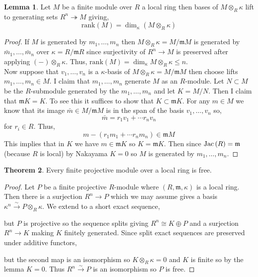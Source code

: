 \documentclass[12pt]{extarticle}
\theoremstyle{definition}
\newtheorem{theorem}{Theorem}[section]
\newtheorem{lemma}[theorem]{Lemma}
\newcommand{\m}{\mathfrak{m}}
\newcommand{\onto}{\twoheadrightarrow}
\begin{document}
\begin{lemma}
Let $M$ be a finite module over $R$ a local ring then bases of $M \otimes_R \kappa$ lift to generating sets $R^n \onto M$ giving,
\[ \mathrm{rank}(M) = \dim_{\kappa}{(M \otimes_R \kappa)} \]
\end{lemma}

\begin{proof}
If $M$ is generated by $m_1, \dots, m_n$ then $M \otimes_R \kappa = M / \m M$ is generated by $\bar{m}_1, \dots, \bar{m}_n$ over $\kappa = R / \m R$ since surjectivity of $R^n \to M$ is preserved after applying $(-) \otimes_R \kappa$. Thus, $\mathrm{rank}(M) = \dim_{\kappa} M \otimes_{R} \kappa \le n$. 
\bigskip\\
Now suppose that $v_1, \dots, v_n$ is a $\kappa$-basis of $M \otimes_{R} \kappa = M / \m M$ then choose lifts $m_1, \dots, m_n \in M$. I claim that $m_1, \dots, m_n$ generate $M$ as an $R$-module. Let $N \subset M$ be the $R$-submodule generated by the $m_1, \dots, m_n$ and let $K = M / N$. Then I claim that $\m K = K$. To see this it suffices to show that $K \subset \m K$. For any $m \in M$ we know that its image $\bar{m} \in M / \m M$ is in the span of the basis $v_1, \dots, v_n$ so,
\[ \bar{m} = r_1 v_1 + \cdots r_n v_n \]
for $r_i \in R$. Thus,
\[ m - (r_1 m_1 + \cdots r_n m_n) \in \m M \]
This implies that in $K$ we have $m \in \m K$ so $K = \m K$. Then since $\Jac{R} = \m$ (because $R$ is local) by Nakayama $K = 0$ so $M$ is generated by $m_1, \dots, m_n$. 
\end{proof}

\begin{theorem}
Every finite projective module over a local ring is free.
\end{theorem}

\begin{proof}
Let $P$ be a finite projective $R$-module where $(R, \m, \kappa)$ is a local ring. Then there is a surjection $R^n \to P$ which we may assume gives a basis $\kappa^n \xrightarrow{\sim} P \otimes_R \kappa$. We extend to a short exact sequence,
\begin{center}
\end{center}
but $P$ is projective so the sequence splits giving $R^n \cong K \oplus P$ and a surjection $R^n \to K$ making $K$ finitely generated. Since split exact sequences are preserved under additive functors,
\begin{center}
\end{center}
but the second map is an isomorphism so $K \otimes_R \kappa = 0$ and $K$ is finite so by the lemma $K = 0$. Thus $R^n \xrightarrow{\sim} P$ is an isomorphism so $P$ is free.
\end{proof}
\end{document}
